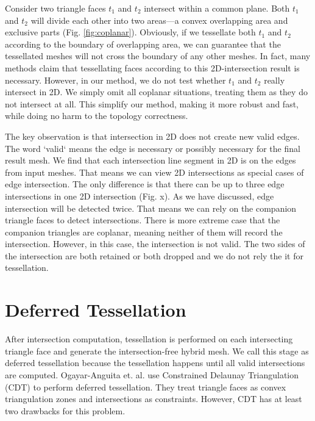 \documentclass[10pt,journal,compsoc]{IEEEtran}
\begin{document}
Consider two triangle faces $t_1$ and $t_2$ intersect within a common plane. Both $t_1$ and $t_2$ will divide each other into two areas---a convex overlapping area and exclusive parts (Fig. \ref{fig:coplanar}). Obviously, if we tessellate both $t_1$ and $t_2$ according to the boundary of overlapping area, we can guarantee that the tessellated meshes will not cross the boundary of any other meshes. In fact, many methods \cite{feito2013fast,zhou2016mesh} claim that tessellating faces according to this 2D-intersection result is necessary. However, in our method, we do not test whether $t_1$ and $t_2$ really intersect in 2D. We simply omit all coplanar situations, treating them as they do not intersect at all. This simplify our method, making it more robust and fast, while doing no harm to the topology correctness.

The key observation is that intersection in 2D does not create new valid edges. The word `valid` means the edge is necessary or possibly necessary for the final result mesh. We find that each intersection line segment in 2D is on the edges from input meshes. That means we can view 2D intersections as special cases of edge intersection. The only difference is that there can be up to three edge intersections in one 2D intersection (Fig. x). As we have discussed, edge intersection will be detected twice. That means we can rely on the companion triangle faces to detect intersections. There is more extreme case that the companion triangles are coplanar, meaning neither of them will record the intersection. However, in this case, the intersection is not valid. The two sides of the intersection are both retained or both dropped and we do not rely the it for tessellation.

\section{Deferred Tessellation}



\label{sec:tessellation}
After intersection computation, tessellation is performed on each intersecting triangle face and generate the intersection-free hybrid mesh. We call this stage as deferred tessellation because the tessellation happens until all valid intersections are computed. Ogayar-Anguita et. al. \cite{ogayar2015deferred} use Constrained Delaunay Triangulation (CDT) to perform deferred tessellation. They treat triangle faces as convex triangulation zones and intersections as constraints. However, CDT has at least two drawbacks for this problem.
\end{document}
